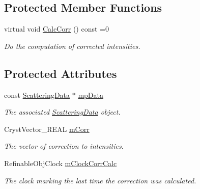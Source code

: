 \subsection*{Protected Member Functions}
\begin{DoxyCompactItemize}
\item 
\mbox{\label{class_obj_cryst_1_1_scattering_corr_a437a916156f6d88c76cb01ca4c748c89}} 
virtual void \mbox{\hyperlink{class_obj_cryst_1_1_scattering_corr_a437a916156f6d88c76cb01ca4c748c89}{Calc\+Corr}} () const =0
\begin{DoxyCompactList}\small\item\em Do the computation of corrected intensities. \end{DoxyCompactList}\end{DoxyCompactItemize}
\subsection*{Protected Attributes}
\begin{DoxyCompactItemize}
\item 
\mbox{\label{class_obj_cryst_1_1_scattering_corr_a0fa066328104835ff72ddf98687c8513}} 
const \mbox{\hyperlink{class_obj_cryst_1_1_scattering_data}{Scattering\+Data}} $\ast$ \mbox{\hyperlink{class_obj_cryst_1_1_scattering_corr_a0fa066328104835ff72ddf98687c8513}{mp\+Data}}
\begin{DoxyCompactList}\small\item\em The associated \mbox{\hyperlink{class_obj_cryst_1_1_scattering_data}{Scattering\+Data}} object. \end{DoxyCompactList}\item 
\mbox{\label{class_obj_cryst_1_1_scattering_corr_a7669922ac4bbdfb826748148d4016088}} 
Cryst\+Vector\+\_\+\+R\+E\+AL \mbox{\hyperlink{class_obj_cryst_1_1_scattering_corr_a7669922ac4bbdfb826748148d4016088}{m\+Corr}}
\begin{DoxyCompactList}\small\item\em The vector of correction to intensities. \end{DoxyCompactList}\item 
\mbox{\label{class_obj_cryst_1_1_scattering_corr_aa969418138a9d1867797857318d6f303}} 
Refinable\+Obj\+Clock \mbox{\hyperlink{class_obj_cryst_1_1_scattering_corr_aa969418138a9d1867797857318d6f303}{m\+Clock\+Corr\+Calc}}
\begin{DoxyCompactList}\small\item\em The clock marking the last time the correction was calculated. \end{DoxyCompactList}\end{DoxyCompactItemize}


